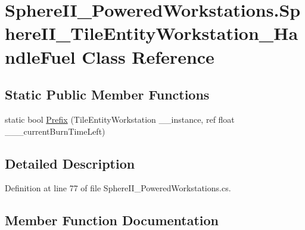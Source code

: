\hypertarget{class_sphere_i_i___powered_workstations_1_1_sphere_i_i___tile_entity_workstation___handle_fuel}{}\section{Sphere\+I\+I\+\_\+\+Powered\+Workstations.\+Sphere\+I\+I\+\_\+\+Tile\+Entity\+Workstation\+\_\+\+Handle\+Fuel Class Reference}
\label{class_sphere_i_i___powered_workstations_1_1_sphere_i_i___tile_entity_workstation___handle_fuel}
\subsection*{Static Public Member Functions}
\begin{DoxyCompactItemize}
\item 
static bool \mbox{\hyperlink{class_sphere_i_i___powered_workstations_1_1_sphere_i_i___tile_entity_workstation___handle_fuel_afccc9a59dc2efde11c23b313155036dc}{Prefix}} (Tile\+Entity\+Workstation \+\_\+\+\_\+instance, ref float \+\_\+\+\_\+\+\_\+current\+Burn\+Time\+Left)
\end{DoxyCompactItemize}


\subsection{Detailed Description}


Definition at line 77 of file Sphere\+I\+I\+\_\+\+Powered\+Workstations.\+cs.



\subsection{Member Function Documentation}
\mbox{\label{class_sphere_i_i___powered_workstations_1_1_sphere_i_i___tile_entity_workstation___handle_fuel_afccc9a59dc2efde11c23b313155036dc}} 
